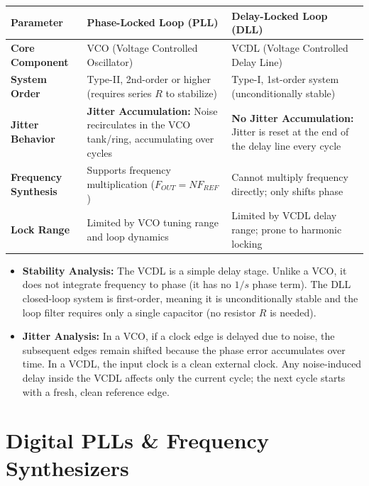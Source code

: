 \documentclass[12pt,a4paper]{article}
\begin{document}
\begin{tcolorbox}[tikzbox, title={Comparison of PLL and DLL Architectures}]
\centering
\par\noindent
\begin{tabularx}{\linewidth}{|B{3.2cm}|Y|Y|}
\hline
\textbf{Parameter} & \textbf{Phase-Locked Loop (PLL)} & \textbf{Delay-Locked Loop (DLL)} \\ \hline
\textbf{Core Component} & VCO (Voltage Controlled Oscillator) & VCDL (Voltage Controlled Delay Line) \\ \hline
\textbf{System Order} & Type-II, 2nd-order or higher (requires series $R$ to stabilize) & Type-I, 1st-order system (unconditionally stable) \\ \hline
\textbf{Jitter Behavior} & \textbf{Jitter Accumulation:} Noise recirculates in the VCO tank/ring, accumulating over cycles & \textbf{No Jitter Accumulation:} Jitter is reset at the end of the delay line every cycle \\ \hline
\textbf{Frequency Synthesis} & Supports frequency multiplication ($F_{OUT} = N F_{REF}$) & Cannot multiply frequency directly; only shifts phase \\ \hline
\textbf{Lock Range} & Limited by VCO tuning range and loop dynamics & Limited by VCDL delay range; prone to harmonic locking \\ \hline
\end{tabularx}
\end{tcolorbox}

\begin{itemize}[leftmargin=*, itemsep=2.5pt]
  \item \textbf{Stability Analysis:} The VCDL is a simple delay stage. Unlike a VCO, it does not integrate frequency to phase (it has no $1/s$ phase term). The DLL closed-loop system is first-order, meaning it is unconditionally stable and the loop filter requires only a single capacitor (no resistor $R$ is needed).
  \item \textbf{Jitter Analysis:} In a VCO, if a clock edge is delayed due to noise, the subsequent edges remain shifted because the phase error accumulates over time. In a VCDL, the input clock is a clean external clock. Any noise-induced delay inside the VCDL affects only the current cycle; the next cycle starts with a fresh, clean reference edge.
\end{itemize}

\section{Digital PLLs \& Frequency Synthesizers}
\end{document}
